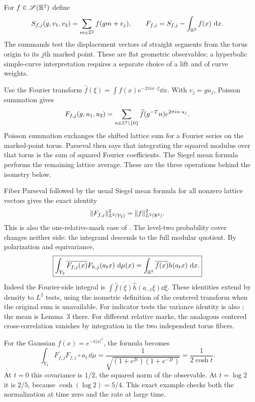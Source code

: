For
$f\in\mathscr S(\mathbb R^2)$ define
\[
 S_{f,j}(g,v_1,v_2)=\sum_{m\in\mathbb Z^2}f(gm+v_j),\qquad
 F_{f,j}=S_{f,j}-\int_{\mathbb R^2}f(x)\,\mathop{}\!\mathrm d x.
\]
The summands test the displacement vectors of straight segments from
the torus origin to its $j$th marked point. These are flat geometric
observables; a hyperbolic simple-curve interpretation requires a
separate choice of a lift and of curve weights.

Use the Fourier transform
$\widehat f(\xi)=\int f(x)e^{-2\pi i x\cdot\xi}\dd x$.
With $v_j=gu_j$, Poisson summation gives
\[
 F_{f,j}(g,u_1,u_2)=
 \sum_{n\in\mathbb Z^2\setminus\{0\}}
       \widehat f(g^{-T}n)e^{2\pi i n\cdot u_j}.
\]
Poisson summation exchanges the shifted lattice sum for a Fourier
series on the marked-point torus. Parseval then says that integrating
the squared modulus over that torus is the sum of squared Fourier
coefficients. The Siegel mean formula performs the remaining lattice
average. These are the three operations behind the isometry below.

Fiber Parseval followed by the usual Siegel mean formula for all
nonzero lattice vectors gives the exact identity
\begin{equation}
 \|F_{f,j}\|_{L^2(Y_2)}^2=\|f\|_{L^2(\mathbb R^2)}^2.
 \label{eq:affinesiegelisometry}
\end{equation}
This is also the one-relative-mark case of
\cite[Proposition~6.11]{AthreyaLagaceMollerRaum}.
The level-two probability cover changes neither side: the integrand
descends to the full modular quotient. By polarization and equivariance,
\begin{equation}
 \boxed{
 \int_{Y_2}\overline{F_{f,j}(x)}F_{h,j}(a_tx)\,\mathop{}\!\mathrm d\mu(x)
 =\int_{\mathbb R^2}\overline{f(x)}h(a_tx)\,\mathop{}\!\mathrm d x.
 }
 \label{eq:affinesiegelexactcorr}
\end{equation}
Indeed the Fourier-side integral is
$\int\overline{\widehat f(\xi)}\widehat h(a_{-t}\xi)\dd\xi$.
These identities extend by density to $L^2$ tests, using the isometric
definition of the centered transform when the original sum is unavailable.
For indicator tests the variance identity is also
\cite[Lemma~4]{AthreyaAffineLattices}; the mean is Lemma~3 there.
For different relative marks, the analogous centered cross-correlation
vanishes by integration in the two independent torus fibers.

For the Gaussian $f(x)=e^{-\pi|x|^2}$, the formula becomes
\begin{equation}
 \int_{Y_2}\overline{F_{f,j}}F_{f,j}\circ a_t\,\dd\mu
 =\frac1{\sqrt{(1+e^{2t})(1+e^{-2t})}}
 =\frac1{2\cosh t}.
 \label{eq:affinegaussiancorr}
\end{equation}
At $t=0$ this covariance is $1/2$, the squared norm of the
observable. At $t=\log 2$ it is $2/5$, because
$\cosh(\log2)=5/4$. This exact example checks both the
normalization at time zero and the rate at large time.

